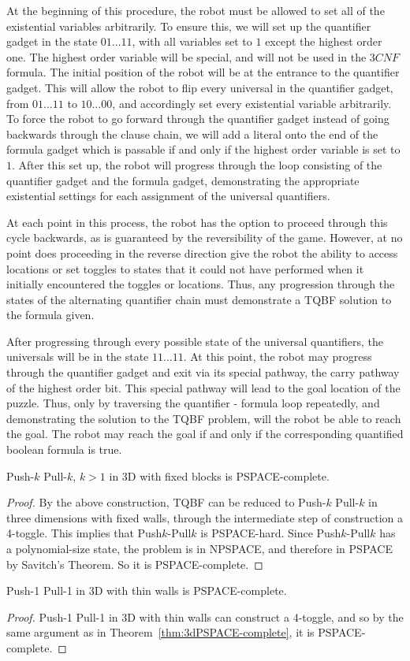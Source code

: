 At the beginning of this procedure, the robot must be allowed to set all of the existential variables arbitrarily.
To ensure this, we will set up the quantifier gadget in the state $01 \ldots 11$, with all variables set to $1$
except the highest order one.  The highest order variable will be special, and will not be used in the $3CNF$
formula. The initial position of the robot will be at the entrance to the quantifier gadget. This will allow
the robot to flip every universal in the quantifier gadget, from $01 \ldots 11$ to $10 \ldots 00$, and accordingly
set every existential variable arbitrarily. To force the robot to go forward through the quantifier gadget
instead of going backwards through the clause chain, we will add a literal onto the end of the formula gadget
which is passable if and only if the highest order variable is set to $1$.
After this set up, the robot will progress through the loop consisting of the quantifier gadget and the
formula gadget, demonstrating the appropriate existential settings for each assignment of the universal
quantifiers.

At each point in this process, the robot has the option to proceed through this cycle backwards, as is
guaranteed by the reversibility of the game. However, at no point does proceeding in the reverse direction
give the robot the ability to access locations or set toggles to states that it could not have performed
when it initially encountered the toggles or locations. Thus, any progression through the states of the
alternating quantifier chain must demonstrate a TQBF solution to the formula given.

After progressing through every possible state of the universal quantifiers, the universals will be in the
state $11 \ldots 11$. At this point, the robot may progress through the quantifier gadget and exit via its special
pathway,
the carry pathway of the highest order bit. This special pathway will lead to the goal location of the puzzle.
Thus, only by traversing the quantifier - formula loop repeatedly, and demonstrating the solution to the TQBF
problem,
will the robot be able to reach the goal. The robot may reach the goal if and only if the corresponding quantified
boolean formula is true.

\begin{theorem}
    \label{thm:3dPSPACE-complete}
    Push-$k$ Pull-$k$, $k>1$ in 3D with fixed blocks is PSPACE-complete.
\end{theorem}
\begin{proof}
By the above construction, TQBF can be reduced to Push-$k$ Pull-$k$ in three dimensions with fixed walls, through the intermediate step of construction a 4-toggle. This implies that Push$k$-Pull$k$ is PSPACE-hard.
Since Push$k$-Pull$k$ has a polynomial-size state, the problem is in NPSPACE, and therefore in PSPACE by Savitch's Theorem\cite{SAVITCH1970177}. So it is PSPACE-complete.
\end{proof}

\begin{theorem}
    Push-1 Pull-1 in 3D with thin walls is PSPACE-complete.
\end{theorem}
\begin{proof}
    Push-1 Pull-1 in 3D with thin walls can construct a 4-toggle, and so by the same argument as in Theorem~\ref{thm:3dPSPACE-complete}, it is PSPACE-complete.
\end{proof}
